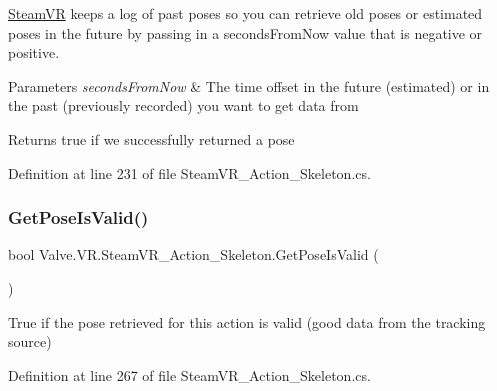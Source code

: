 \mbox{\hyperlink{class_valve_1_1_v_r_1_1_steam_v_r}{Steam\+VR}} keeps a log of past poses so you can retrieve old poses or estimated poses in the future by passing in a seconds\+From\+Now value that is negative or positive. 


\begin{DoxyParams}{Parameters}
{\em seconds\+From\+Now} & The time offset in the future (estimated) or in the past (previously recorded) you want to get data from\\
\hline
\end{DoxyParams}
\begin{DoxyReturn}{Returns}
true if we successfully returned a pose
\end{DoxyReturn}


Definition at line 231 of file Steam\+V\+R\+\_\+\+Action\+\_\+\+Skeleton.\+cs.

\mbox{\label{class_valve_1_1_v_r_1_1_steam_v_r___action___skeleton_a31f87068cc6ae263dce933efbc395cb2}} 
\subsubsection{\texorpdfstring{GetPoseIsValid()}{GetPoseIsValid()}}
{\footnotesize\ttfamily bool Valve.\+V\+R.\+Steam\+V\+R\+\_\+\+Action\+\_\+\+Skeleton.\+Get\+Pose\+Is\+Valid (\begin{DoxyParamCaption}{ }\end{DoxyParamCaption})}



True if the pose retrieved for this action is valid (good data from the tracking source) 



Definition at line 267 of file Steam\+V\+R\+\_\+\+Action\+\_\+\+Skeleton.\+cs.

\mbox{\label{class_valve_1_1_v_r_1_1_steam_v_r___action___skeleton_a456a63483d7225b1618ccc5d6757bee5}} 
